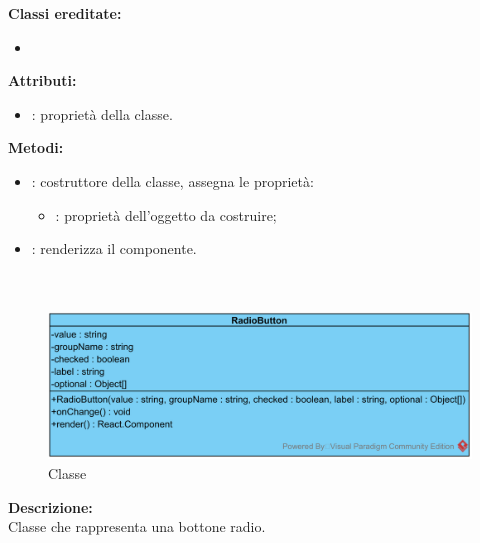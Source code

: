 
\textbf{Classi ereditate:}
\begin{itemize}
	\item {}
\end{itemize}


\textbf{Attributi:}
\begin{itemize}
	\item {}: proprietà della classe.
\end{itemize}

\textbf{Metodi:}
\begin{itemize}
	\item {}: costruttore della classe, assegna le proprietà:
	\begin{itemize}
		\item {}: proprietà dell'oggetto da costruire;
	\end{itemize}
	\item {}: renderizza il componente.
\end{itemize}

\paragraph[::RadioButton]{\class}\mbox{}\\ \label{\class}
\begin{figure}[H]
	\centering
	\includegraphics[width=14cm]{./diagrammi/framework/view/gui/radiobutton.png}
	\caption{Classe \class}
\end{figure}
\textbf{Descrizione:}\\
Classe che rappresenta una bottone radio.

